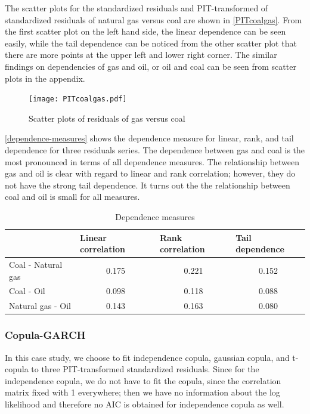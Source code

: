 \documentclass[12pt,a4paper]{article}
\newcommand\colorAutoref[1]{{\hypersetup{linkcolor=black}\autoref{#1}}}
\numberwithin{equation}{section}
\begin{document}
The scatter plots for the standardized residuals and PIT-transformed of standardized residuals of natural gas versus coal are shown in \colorAutoref{PITcoalgas}. From the first scatter plot on the left hand side, the linear dependence can be seen easily, while the tail dependence can be noticed from the other scatter plot that there are more points at the upper left and lower right corner. The similar findings on dependencies of gas and oil, or oil and coal can be seen from scatter plots in the appendix.

\begin{figure}[ht!]
\centering
\texttt{[image: PITcoalgas.pdf]}
\vspace*{-15mm}
\caption{Scatter plots of residuals of gas versus coal}
\label{PITcoalgas}
\end{figure}

\colorAutoref{dependence-measures} shows the dependence measure for linear, rank, and tail dependence for three residuals series. The dependence between gas and coal is the most pronounced in terms of all dependence measures. The relationship between gas and oil is clear with regard to linear and rank correlation; however, they do not have the strong tail dependence. It turns out the the relationship between coal and oil is small for all measures.

\begin{table}[]
\centering
\caption{Dependence measures } \label{dependence-measures}
\begin{tabular}{lccc}
\hline
 & \multicolumn{1}{l}{Linear correlation} & \multicolumn{1}{l}{Rank correlation} & \multicolumn{1}{l}{Tail dependence} \\ \hline
Coal - Natural gas & 0.175 & 0.221 & 0.152 \\
Coal - Oil & 0.098 & 0.118 & 0.088 \\
Natural gas - Oil & 0.143 & 0.163 & 0.080 \\ \hline
\end{tabular}
\end{table}

\subsubsection{Copula-GARCH}
In this case study, we choose to fit independence copula, gaussian copula, and t-copula to three PIT-transformed standardized residuals. Since for the independence copula, we do not have to fit the copula, since the correlation matrix fixed with 1 everywhere; then we have no information about the log likelihood and therefore no AIC is obtained for independence copula as well.
\end{document}
